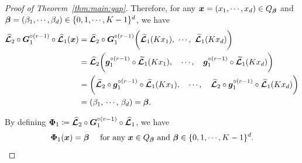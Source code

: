 \documentclass[nohyperref]{article}
\theoremstyle{plain}
\theoremstyle{definition}
\theoremstyle{remark}
\begin{document}
\begin{proof}[Proof of Theorem~\ref{thm:main:gap}]
Therefore, for any $\bmx=(x_1,\dotsc,x_d)\in Q_\bmbeta$ and $\bmbeta=(\beta_1,\dotsc,\beta_d)\in \{0,1,\dotsc,K-1\}^d$, we have
\begin{equation*}
	\begin{split}
		\bmhatcalL_2\circ \bmG_1^{\circ (r-1)}\circ \bmhatcalL_1(\bmx)
		&= \bmhatcalL_2\circ \bmG_1^{\circ (r-1)}\bigg(\bmtildecalL_1(Kx_1),\    \dotsc,\    \bmtildecalL_1(Kx_d)\bigg)\\
		& = \bmhatcalL_2\bigg(\bmg_1^{\circ (r-1)}\circ\bmtildecalL_1(Kx_1),\quad  \dotsc,\quad  \bmg_1^{\circ (r-1)}\circ\bmtildecalL_1(Kx_d)\bigg)\\
		&= \bigg(\bmtildecalL_2\circ \bmg_1^{\circ (r-1)}\circ\bmtildecalL_1(Kx_1),\quad  \dotsc,\quad \bmtildecalL_2\circ \bmg_1^{\circ (r-1)}\circ\bmtildecalL_1(Kx_d)\bigg)\\
		&= (\beta_1,\, \dotsc,\, \beta_d)=\bmbeta.
	\end{split}
\end{equation*}

By defining ${\bm{\Phi}}_1\coloneqq 	{\bm{\mathcal{\widehat{L}}}}_2\circ {\bm{G}}_1^{\circ (r-1)}\circ {\bm{\mathcal{\widehat{L}}}}_1$, we have  
\begin{equation}
	\label{eq:Phi1:output:beta}
	\bmPhi_1(\bmx)=\bmbeta\quad \tn{ for any $\bmx\in Q_\bmbeta$ and $\bmbeta\in \{0,1,\dotsc,K-1\}^d$.}
\end{equation}
%



\end{proof}
\end{document}
